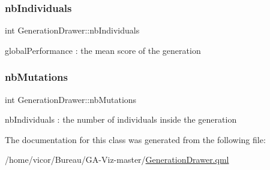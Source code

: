 \subsubsection{\texorpdfstring{nb\+Individuals}{nbIndividuals}}
{\footnotesize\ttfamily int Generation\+Drawer\+::nb\+Individuals}

global\+Performance \+: the mean score of the generation \mbox{\label{class_generation_drawer_a34ebc0a04244dd38adfc754d84cb2155}} 
\subsubsection{\texorpdfstring{nb\+Mutations}{nbMutations}}
{\footnotesize\ttfamily int Generation\+Drawer\+::nb\+Mutations}

nb\+Individuals \+: the number of individuals inside the generation 

The documentation for this class was generated from the following file\+:\begin{DoxyCompactItemize}
\item 
/home/vicor/\+Bureau/\+G\+A-\/\+Viz-\/master/\hyperlink{_generation_drawer_8qml}{Generation\+Drawer.\+qml}\end{DoxyCompactItemize}

